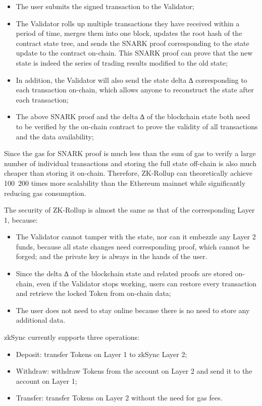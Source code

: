 \documentclass[]{template/llncs}
\begin{document}
\begin{itemize}
	\item The user submits the signed transaction to the Validator;
	\item The Validator rolls up multiple transactions they have received within a period of time, merges them into one block, updates the root hash of the contract state tree, and sends the SNARK proof corresponding to the state update to the contract on-chain. This SNARK proof can prove that the new state is indeed the series of trading results modified to the old state;
	\item In addition, the Validator will also send the state delta ∆ corresponding to each transaction on-chain, which allows anyone to reconstruct the state after each transaction;
	\item The above SNARK proof and the delta ∆ of the blockchain state both need to be verified by the on-chain contract to prove the validity of all transactions and the data availability; 
\end{itemize}

Since the gas for SNARK proof is much less than the sum of gas to verify a large number of individual transactions and storing the full state off-chain is also much cheaper than storing it on-chain. Therefore, ZK-Rollup can theoretically achieve 100~200 times more scalability than the Ethereum mainnet while significantly reducing gas consumption.

The security of ZK-Rollup is almost the same as that of the corresponding Layer 1, because:


\begin{itemize}
	\item The Validator cannot tamper with the state, nor can it embezzle any Layer 2 funds, because all state changes need corresponding proof, which cannot be forged; and the private key is always in the hands of the user.
	\item Since the delta ∆ of the blockchain state and related proofs are stored on-chain, even if the Validator stops working, users can restore every transaction and retrieve the locked Token from on-chain data;
	\item The user does not need to stay online because there is no need to store any additional data.
\end{itemize}

zkSync currently supports three operations:

\begin{itemize}
	\item Deposit: transfer Tokens on Layer 1 to zkSync Layer 2;
	\item Withdraw: withdraw Tokens from the account on Layer 2 and send it to the account on Layer 1;
	\item Transfer: transfer Tokens on Layer 2 without the need for gas fees.
\end{itemize}
\end{document}
